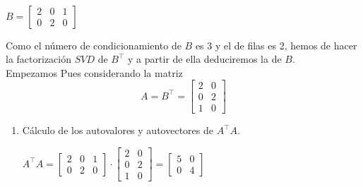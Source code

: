 \begin{enumerate}[label=\color{red}\textbf{\arabic*)}, leftmargin=*]
\[\begin{array}{l}
		\end{array} \]
		$B=\begin{bmatrix}
			2 & 0 & 1\\
			0 & 2 & 0
		\end{bmatrix}$
		
		Como el número de condicionamiento de $B$ es 3 y el de filas es 2, hemos de hacer la factorización $SVD$ de $B^\intercal$ y a partir de ella deduciremos la de $B$.\\
		Empezamos Pues considerando la matriz \[ A=B^\intercal=\begin{bmatrix}
			2 & 0\\
			0 & 2\\
			1 & 0
		\end{bmatrix} \]
		\begin{enumerate}[label=\color{lightblue}\arabic*$^\circ$)]
			\item Cálculo de los autovalores y autovectores de $A^\intercal A$.
			
			$A^\intercal A=\begin{bmatrix}
				2 & 0 & 1\\
				0 & 2 & 0
			\end{bmatrix}\cdot\begin{bmatrix}
			2 & 0\\
			0 & 2\\
			1 & 0
			\end{bmatrix}=\begin{bmatrix}
			5 & 0\\
			0 & 4
			\end{bmatrix}$
			

\end{enumerate}
\end{enumerate}
